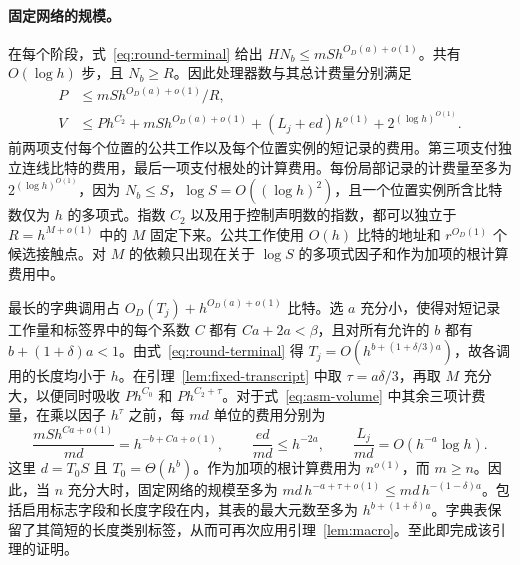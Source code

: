 \paragraph{固定网络的规模。}
在每个阶段，式~\eqref{eq:round-terminal} 给出 $HN_b\le mS h^{O_D(a)+o(1)}$。共有 $O(\log h)$ 步，且 $N_b\ge R$。因此处理器数与其总计费量分别满足
\begin{align}
 P&\le mS h^{O_D(a)+o(1)}/R,\nonumber\\
 V&\le P h^{C_2}+mS h^{O_D(a)+o(1)}
     +(L_j+ed)h^{o(1)}+2^{(\log h)^{O(1)}}.\label{eq:asm-volume}
\end{align}
前两项支付每个位置的公共工作以及每个位置实例的短记录的费用。第三项支付独立连线比特的费用，最后一项支付根处的计算费用。每份局部记录的计费量至多为 $2^{(\log h)^{O(1)}}$，因为 $N_b\le S$，$\log S=O((\log h)^2)$，且一个位置实例所含比特数仅为 $h$ 的多项式。指数 $C_2$ 以及用于控制声明数的指数，都可以独立于 $R=h^{M+o(1)}$ 中的 $M$ 固定下来。公共工作使用 $O(h)$ 比特的地址和 $r^{O_D(1)}$ 个候选接触点。对 $M$ 的依赖只出现在关于 $\log S$ 的多项式因子和作为加项的根计算费用中。

最长的字典调用占 $O_D(T_j)+h^{O_D(a)+o(1)}$ 比特。选 $a$ 充分小，使得对短记录工作量和标签界中的每个系数 $C$ 都有 $Ca+2a<\beta$，且对所有允许的 $b$ 都有 $b+(1+\delta)a<1$。由式~\eqref{eq:round-terminal} 得 $T_j=O(h^{b+(1+\delta/3)a})$，故各调用的长度均小于 $h$。在引理~\ref{lem:fixed-transcript} 中取 $\tau=a\delta/3$，再取 $M$ 充分大，以便同时吸收 $P h^{C_0}$ 和 $P h^{C_2+\tau}$。对于式~\eqref{eq:asm-volume} 中其余三项计费量，在乘以因子 $h^\tau$ 之前，每 $md$ 单位的费用分别为
\[
 \frac{mS h^{Ca+o(1)}}{md}=h^{-b+Ca+o(1)},\qquad
 \frac{ed}{md}\le h^{-2a},\qquad
 \frac{L_j}{md}=O(h^{-a}\log h).
\]
这里 $d=T_0S$ 且 $T_0=\Theta(h^b)$。作为加项的根计算费用为 $n^{o(1)}$，而 $m\ge n$。因此，当 $n$ 充分大时，固定网络的规模至多为 $md\,h^{-a+\tau+o(1)}\le md\,h^{-(1-\delta)a}$。包括启用标志字段和长度字段在内，其表的最大元数至多为 $h^{b+(1+\delta)a}$。字典表保留了其简短的长度类别标签，从而可再次应用引理~\ref{lem:macro}。至此即完成该引理的证明。
